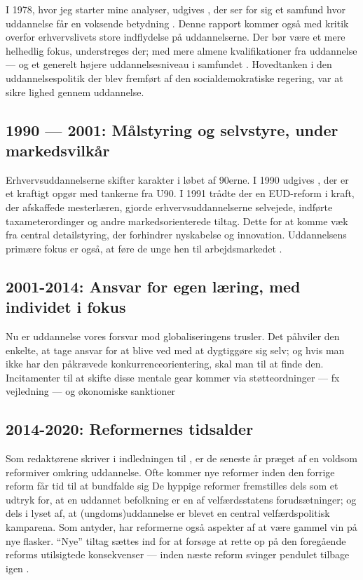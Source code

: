 I 1978, hvor jeg starter mine analyser, udgives , der ser for sig et samfund hvor uddannelse får en voksende betydning \autocite{undervisningsministeriet90SamletUddannelsesplanlaegning1978}.
Denne rapport kommer også med kritik overfor erhvervslivets store indflydelse på uddannelserne.
Der bør være et mere helhedlig fokus, understreges der; med mere almene kvalifikationer fra uddannelse — og et generelt højere uddannelsesniveau i samfundet \autocite[s 18f]{juulDiskurserOmUngdom2013}.
Hovedtanken i den uddannelsespolitik der blev fremført af den socialdemokratiske regering, var at sikre lighed gennem uddannelse.

\subsection{1990 — 2001: Målstyring og selvstyre, under markedsvilkår}

Erhvervsuddannelserne skifter karakter i løbet af 90erne.
I 1990 udgives , der er et kraftigt opgør med tankerne fra U90.
I 1991 trådte der en EUD-reform i kraft, der afskaffede mesterlæren, gjorde erhvervsuddannelserne selvejede, indførte taxameterordinger og andre markedsorienterede tiltag.
Dette for at komme væk fra central detailstyring, der forhindrer nyskabelse og innovation.
Uddannelsens primære fokus er også, at føre de unge hen til arbejdsmarkedet \autocite[s. 19]{juulDiskurserOmUngdom2013}.

\subsection{2001-2014: Ansvar for egen læring, med individet i fokus}

Nu er uddannelse vores forsvar mod globaliseringens trusler.
Det påhviler den enkelte, at tage ansvar for at blive ved med at dygtiggøre sig selv; og hvis man ikke har den påkrævede konkurrenceorientering, skal man til at finde den.
Incitamenter til at skifte disse mentale gear kommer via støtteordninger — fx vejledning — og økonomiske sanktioner

\subsection{2014-2020: Reformernes tidsalder}

Som redaktørene skriver i indledningen til , er de seneste år præget af en voldsom reformiver omkring uddannelse.
Ofte kommer nye reformer inden den forrige reform får tid til at bundfalde sig
De hyppige reformer fremstilles dels som et udtryk for, at en uddannet befolkning er en af velfærdsstatens forudsætninger; og dels i lyset af, at (ungdoms)uddannelse er blevet en central velfærdspolitisk kamparena.
Som \citeauthor{jorgensenReformenAfErhvervsuddannelserne2016} antyder, har reformerne også aspekter af at være gammel vin på nye flasker.
“Nye” tiltag sættes ind for at forsøge at rette op på den foregående reforms utilsigtede konsekvenser — inden næste reform svinger pendulet tilbage igen \autocite[s.9 ]{jorgensenReformenAfErhvervsuddannelserne2016}.

